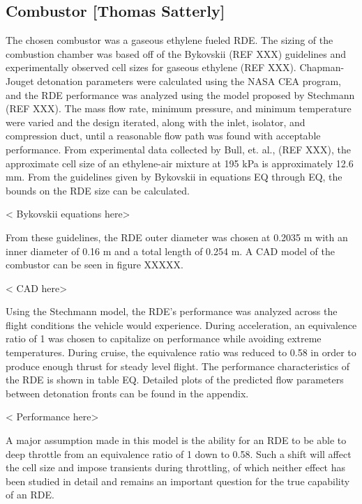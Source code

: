 \subsection{Combustor [Thomas Satterly]}
The chosen combustor was a gaseous ethylene fueled RDE. The sizing of the combustion chamber was based off of the Bykovskii (REF XXX) guidelines and experimentally observed cell sizes for gaseous ethylene (REF XXX). Chapman-Jouget detonation parameters were calculated using the NASA CEA program, and the RDE performance was analyzed using the model proposed by Stechmann (REF XXX). The mass flow rate, minimum pressure, and minimum temperature were varied and the design iterated, along with the inlet, isolator, and compression duct, until a reasonable flow path was found with acceptable performance. 
    From experimental data collected by Bull, et. al., (REF XXX), the approximate cell size of an ethylene-air mixture at 195 kPa is approximately 12.6 mm. From the guidelines given by Bykovskii in equations EQ through EQ, the bounds on the RDE size can be calculated.

< Bykovskii equations here>

    From these guidelines, the RDE outer diameter was chosen at 0.2035 m with an inner diameter of 0.16 m and a total length of 0.254 m. A CAD model of the combustor can be seen in figure XXXXX.

< CAD here>

    Using the Stechmann model, the RDE’s performance was analyzed across the flight conditions the vehicle would experience. During acceleration, an equivalence ratio of 1 was chosen to capitalize on performance while avoiding extreme temperatures. During cruise, the equivalence ratio was reduced to 0.58 in order to produce enough thrust for steady level flight. The performance characteristics of the RDE is shown in table EQ. Detailed plots of the predicted flow parameters between detonation fronts can be found in the appendix.

< Performance here>

    A major assumption made in this model is the ability for an RDE to be able to deep throttle from an equivalence ratio of 1 down to 0.58. Such a shift will affect the cell size and impose transients during throttling, of which neither effect has been studied in detail and remains an important question for the true capability of an RDE. 
